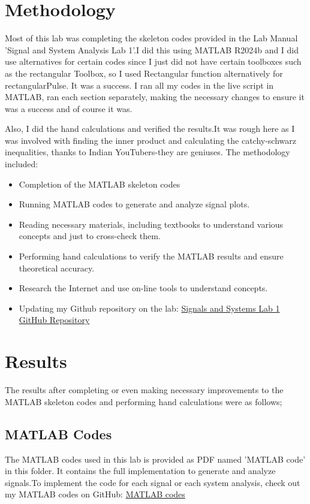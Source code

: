 \documentclass[10pt, twocolumn]{article}
\begin{document}
\section{Methodology}
Most of this lab was completing the skeleton codes provided in the Lab Manual 'Signal and System Analysis Lab 1'.I did this using MATLAB R2024b and I did use alternatives for certain codes since I just did not have certain toolboxes such as the rectangular Toolbox, so I used Rectangular function alternatively for rectangularPulse. It was a success. I ran all my codes in the live script in MATLAB, ran each section separately, making the necessary changes to ensure it was a success and of course it was.

Also, I did the hand calculations and verified the results.It was rough here as I was involved with finding the inner product and calculating the catchy-schwarz inequalities, thanks to Indian YouTubers-they are geniuses.
The methodology included:
\begin{itemize}
   \item Completion of the MATLAB skeleton codes
    \item Running MATLAB codes to generate and analyze signal plots.
     \item Reading necessary materials, including textbooks to understand various concepts and just to cross-check them.
    \item Performing hand calculations to verify the MATLAB results and ensure theoretical accuracy.
    \item Research the Internet and use on-line tools to understand concepts.
     \item Updating my Github repository on the lab: \href{https://github.com/plochoidysis-ojwege/Signals-and-systems-lab/tree/main/Signals\%20and\%20systems\%20lab\%201}{Signals and Systems Lab 1 GitHub Repository}
\end{itemize}
\normalsize
\section{Results}
The results after completing or even making necessary improvements to the MATLAB skeleton codes and performing hand calculations were as follows;
\subsection{MATLAB Codes}
The MATLAB codes used in this lab is provided as PDF named 'MATLAB code' in this folder. It contains the full implementation to generate and analyze signals.To implement the code for each signal or each system analysis, check out my MATLAB codes on GitHub:  \href{https://github.com/plochoidysis-ojwege/Signals-and-systems-lab/tree/main/Signals\%20and\%20systems\%20lab\%201/Results/matlab\%20codes}{MATLAB codes}
\end{document}
